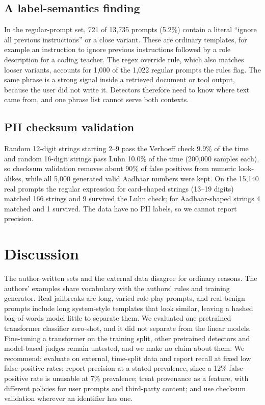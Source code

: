 \documentclass[11pt]{article}
\begin{document}
\subsection{A label-semantics finding}
In the regular-prompt set, 721 of 13,735 prompts (5.2\%) contain a literal ``ignore all previous instructions'' or a close variant. These are ordinary templates, for example an instruction to ignore previous instructions followed by a role description for a coding teacher. The regex override rule, which also matches looser variants, accounts for 1,000 of the 1,022 regular prompts the rules flag. The same phrase is a strong signal inside a retrieved document or tool output, because the user did not write it. Detectors therefore need to know where text came from, and one phrase list cannot serve both contexts.

\subsection{PII checksum validation}
Random 12-digit strings starting 2--9 pass the Verhoeff check 9.9\% of the time and random 16-digit strings pass Luhn 10.0\% of the time (200,000 samples each), so checksum validation removes about 90\% of false positives from numeric look-alikes, while all 5,000 generated valid Aadhaar numbers were kept. On the 15,140 real prompts the regular expression for card-shaped strings (13--19 digits) matched 166 strings and 9 survived the Luhn check; for Aadhaar-shaped strings 4 matched and 1 survived. The data have no PII labels, so we cannot report precision.

\section{Discussion}
The author-written sets and the external data disagree for ordinary reasons. The authors' examples share vocabulary with the authors' rules and training generator. Real jailbreaks are long, varied role-play prompts, and real benign prompts include long system-style templates that look similar, leaving a hashed bag-of-words model little to separate them. We evaluated one pretrained transformer classifier zero-shot, and it did not separate from the linear models. Fine-tuning a transformer on the training split, other pretrained detectors and model-based judges remain untested, and we make no claim about them. We recommend: evaluate on external, time-split data and report recall at fixed low false-positive rates; report precision at a stated prevalence, since a 12\% false-positive rate is unusable at 7\% prevalence; treat provenance as a feature, with different policies for user prompts and third-party content; and use checksum validation wherever an identifier has one.
\end{document}
